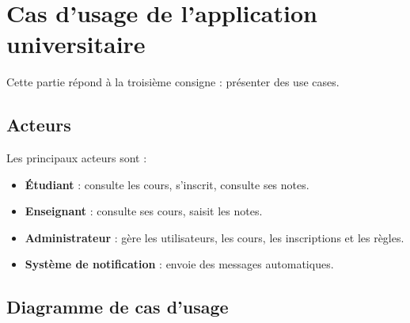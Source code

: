 \documentclass[12pt,a4paper]{article}
\newcommand{\acteur}[1]{\textbf{#1}}
\begin{document}
\newpage

\section{Cas d'usage de l'application universitaire}

Cette partie répond à la troisième consigne : présenter des use cases.

\subsection{Acteurs}

Les principaux acteurs sont :

\begin{itemize}
    \item \acteur{Étudiant} : consulte les cours, s'inscrit, consulte ses notes.
    \item \acteur{Enseignant} : consulte ses cours, saisit les notes.
    \item \acteur{Administrateur} : gère les utilisateurs, les cours, les inscriptions et les règles.
    \item \acteur{Système de notification} : envoie des messages automatiques.
\end{itemize}

\subsection{Diagramme de cas d'usage}
\end{document}
